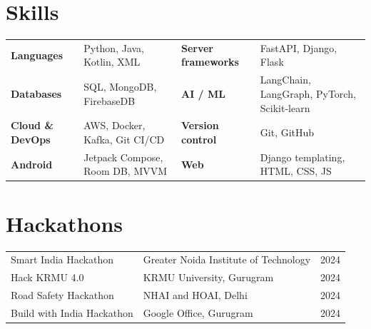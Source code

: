 \documentclass[10pt,a4paper]{article}
\begin{document}
\section{Skills}
\begin{tabularx}{\linewidth}{@{}>{\bfseries}l X >{\bfseries}l X@{}}
  Languages      & Python, Java, Kotlin, XML            & Server frameworks & FastAPI, Django, Flask \\
  Databases      & SQL, MongoDB, FirebaseDB             & AI / ML           & LangChain, LangGraph, PyTorch, Scikit-learn \\
  Cloud \& DevOps & AWS, Docker, Kafka, Git CI/CD       & Version control   & Git, GitHub \\
  Android        & Jetpack Compose, Room DB, MVVM       & Web               & Django templating, HTML, CSS, JS \\
\end{tabularx}

\section{Hackathons}
\begin{tabularx}{\linewidth}{@{}l X r@{}}
  Smart India Hackathon      & Greater Noida Institute of Technology & 2024 \\
  Hack KRMU 4.0              & KRMU University, Gurugram             & 2024 \\
  Road Safety Hackathon      & NHAI and HOAI, Delhi                  & 2024 \\
  Build with India Hackathon & Google Office, Gurugram               & 2024 \\
\end{tabularx}
\end{document}

